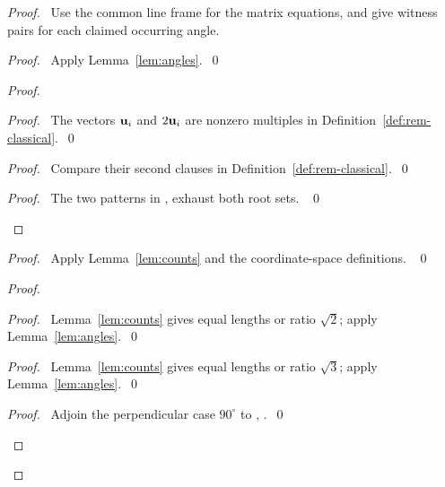 \begin{proof}
\pfsketch\ Use the common line frame for the matrix equations, and give
witness pairs for each claimed occurring angle.
\begin{proof}\pf\ Apply Lemma~\ref{lem:angles}.~\qed\end{proof}
\begin{proof}
\begin{proof}\pf\ The vectors ${\mathbf u}_i$ and $2{\mathbf u}_i$ are nonzero
multiples in Definition~\ref{def:rem-classical}.~\qed\end{proof}
\begin{proof}\pf\ Compare their second clauses in
Definition~\ref{def:rem-classical}.~\qed\end{proof}
\qedstep
\begin{proof}\pf\ The two patterns in ,
 exhaust both root sets. ~\qed\end{proof}
\end{proof}
\begin{proof}\pf\ Apply Lemma~\ref{lem:counts} and the coordinate-space
definitions. ~\qed\end{proof}
\begin{proof}
\begin{proof}\pf\ Lemma~\ref{lem:counts} gives equal lengths or ratio
$\sqrt2$; apply Lemma~\ref{lem:angles}.~\qed\end{proof}
\begin{proof}\pf\ Lemma~\ref{lem:counts} gives equal lengths or ratio
$\sqrt3$; apply Lemma~\ref{lem:angles}.~\qed\end{proof}
\qedstep
\begin{proof}\pf\ Adjoin the perpendicular case $90^\circ$ to
, .~\qed\end{proof}
\end{proof}

\end{proof}
